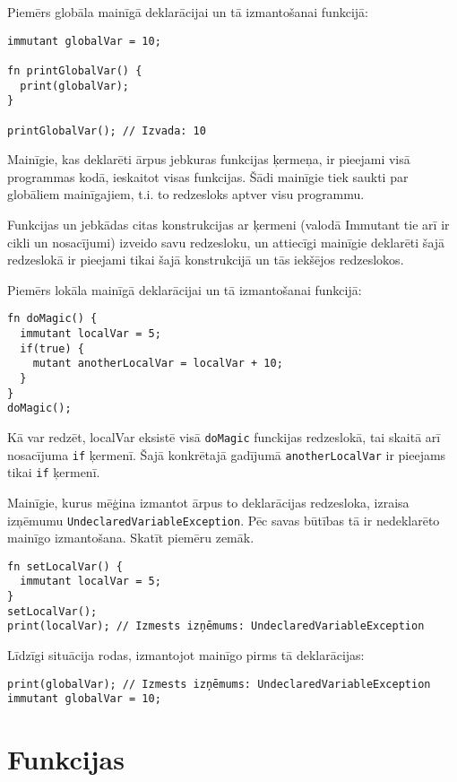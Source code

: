 \documentclass[12pt,a4paper]{report}
\begin{document}
Piemērs globāla mainīgā deklarācijai un tā izmantošanai funkcijā:

\begin{verbatim}
immutant globalVar = 10;

fn printGlobalVar() {
  print(globalVar);
}

printGlobalVar(); // Izvada: 10
\end{verbatim}

Mainīgie, kas deklarēti ārpus jebkuras funkcijas ķermeņa, ir pieejami visā programmas kodā, ieskaitot visas funkcijas. Šādi mainīgie tiek saukti par globāliem mainīgajiem, t.i. to redzesloks aptver visu programmu.

Funkcijas un jebkādas citas konstrukcijas ar ķermeni (valodā Immutant tie arī ir cikli un nosacījumi) izveido savu redzesloku, un attiecīgi mainīgie deklarēti šajā redzeslokā ir pieejami tikai šajā konstrukcijā un tās iekšējos redzeslokos.

Piemērs lokāla mainīgā deklarācijai un tā izmantošanai funkcijā:
\begin{verbatim}
fn doMagic() {
  immutant localVar = 5;
  if(true) {
    mutant anotherLocalVar = localVar + 10;
  }
}
doMagic();
\end{verbatim}

Kā var redzēt, localVar eksistē visā \texttt{doMagic} funckijas redzeslokā, tai skaitā arī nosacījuma \texttt{if} ķermenī. Šajā konkrētajā gadījumā \texttt{anotherLocalVar} ir pieejams tikai \texttt{if} ķermenī.

Mainīgie, kurus mēģina izmantot ārpus to deklarācijas redzesloka, izraisa izņēmumu \texttt{UndeclaredVariableException}. Pēc savas būtības tā ir nedeklarēto mainīgo izmantošana. Skatīt piemēru zemāk.

\begin{verbatim}
fn setLocalVar() {
  immutant localVar = 5;
}
setLocalVar();
print(localVar); // Izmests izņēmums: UndeclaredVariableException
\end{verbatim}

Līdzīgi situācija rodas, izmantojot mainīgo pirms tā deklarācijas:
\begin{verbatim}
print(globalVar); // Izmests izņēmums: UndeclaredVariableException
immutant globalVar = 10;
\end{verbatim}

\section{Funkcijas}
\label{section:functions}
\end{document}
